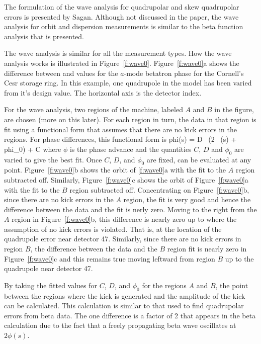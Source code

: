 The formulation of the wave analysis for quadrupolar and skew
quadrupolar errors is presented by Sagan\cite{b:wave}.  Although not
discussed in the paper, the wave analysis for orbit and dispersion
measurements is similar to the beta function analysis that is
presented. 

The wave analysis is similar for all the measurement types. How the
wave analysis works is illustrated in Figure~\ref{f:wave0}.
Figure~\ref{f:wave0}a shows the difference between 
and  values for the $a$-mode betatron phase for the Cornell's 
Cesr storage ring. In this example, one quadrupole in the model has 
been varied from it's design value. The horizontal axis is the detector index. 

For the wave analysis, two regions of the machine, labeled $A$ and $B$
in the figure, are chosen (more on this later). For each region in
turn, the data in that region is fit using a functional form that
assumes that there are no kick errors in the regions. 
For phase differences, this functional form is
\Begineq
  \delta phi(s) = D \, \sin(2 \, \phi(s) + phi_0) + C
  \label{xabps}
\Endeq
where $\phi$ is the phase
advance and the quantities $C$, $D$ and $\phi_0$ are varied to give the best
fit.  Once $C$, $D$, and $\phi_0$ are fixed,  can be evaluated at
any point. Figure~\ref{f:wave0}b shows the orbit of \ref{f:wave0}a
with the fit to the $A$ region subtracted off. Similarly,
Figure~\ref{f:wave0}c shows the orbit of Figure~\ref{f:wave0}a with
the fit to the $B$ region subtracted off. Concentrating on
Figure~\ref{f:wave0}b, since there are no kick errors in the $A$
region, the fit is very good and hence the difference between the data
and the fit is nerly zero. Moving to the right from the $A$ region in
Figure~\ref{f:wave0}b, this difference is nearly zero up to where the
assumption of no kick errors is violated. That is, at the location of
the quadrupole error  near detector 47. Similarly, since there are no kick errors
in region $B$, the difference between the data and the $B$ region fit
is nearly zero in Figure~\ref{f:wave0}c and this remains true moving leftward
from region $B$ up to the quadrupole near detector 47.

By taking the fitted values for $C$, $D$, and $\phi_0$ for the regions $A$
and $B$, the point between the regions where the kick is generated and
the amplitude of the kick can be calculated. This calculation is
similar to that used to find quadrupolar errors from beta
data\cite{f:wave0}. The one difference is a factor of 2 that appears
in the beta calculation due to the fact that a freely propagating beta
wave oscillates at $2\phi(s)$. 

